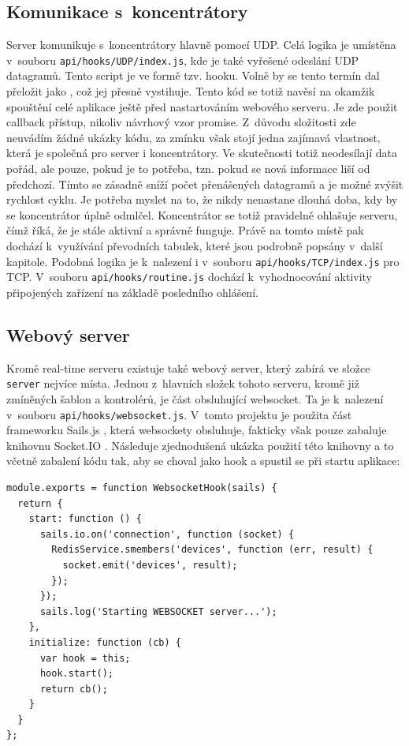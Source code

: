 \subsection{Komunikace s~koncentrátory}
Server komunikuje s~koncentrátory hlavně pomocí UDP. Celá logika je u\-mís\-tě\-na v~souboru \texttt{api/hooks/UDP/index.js}, kde je také vyřešené odeslání UDP datagramů. Tento script je ve formě tzv. hooku.  Volně by se tento termín dal přeložit jako , což jej přesně vystihuje. Tento kód se totiž navěsí na okamžik spouštění celé aplikace ještě před nastartováním webového serveru. Je zde použit callback přístup, nikoliv návrhový vzor promise. Z~dů\-vo\-du složitosti zde neuvádím žádné ukázky kódu, za zmínku však stojí jedna zajímavá vlastnost, která je společná pro server i koncentrátory. Ve sku\-teč\-nosti totiž neodesílají data pořád, ale pouze, pokud je to potřeba, tzn. pokud se nová informace liší od předchozí. Tímto se zásadně sníží počet přenášených datagramů a je možné zvýšit rychlost cyklu. Je potřeba myslet na to, že nikdy nenastane dlouhá doba, kdy by se koncentrátor úplně odmlčel. Koncentrátor se totiž pravidelně ohlašuje serveru, čímž říká, že je stále aktivní a správně funguje. Právě na tomto místě pak dochází k~využívání převodních tabulek, které jsou podrobně popsány v~další kapitole. Podobná logika je k~nalezení i v~souboru \texttt{api/hooks/TCP/index.js} pro TCP. V~souboru \texttt{api/hooks/routine.js} dochází k~vyhodnocování aktivity připojených zařízení na základě posledního ohlášení.

\subsection{Webový server}
Kromě real-time serveru existuje také webový server, který zabírá ve složce \texttt{server} nejvíce místa.  Jednou z~hlavních složek tohoto serveru, kromě již zmíněných šablon a kontrolérů, je část obsluhující websocket. Ta je k~nalezení v~souboru \texttt{api/hooks/websocket.js}. V~tomto projektu je použita část frameworku Sails.js \cite{sails}, která websockety obsluhuje, fakticky však pouze zabaluje knihovnu Socket.IO \cite{socket}. Následuje zjednodušená ukázka použití této knihovny a to včetně zabalení kódu tak, aby se choval jako hook a spustil se při startu aplikace:

\begin{verbatim}
module.exports = function WebsocketHook(sails) {
  return {
    start: function () {
      sails.io.on('connection', function (socket) {
        RedisService.smembers('devices', function (err, result) {
          socket.emit('devices', result);
        });
      });
      sails.log('Starting WEBSOCKET server...');
    },
    initialize: function (cb) {
      var hook = this;
      hook.start();
      return cb();
    }
  }
};
\end{verbatim}

